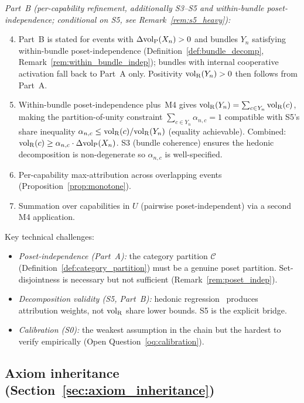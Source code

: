 \emph{Part~B (per-capability refinement, additionally S3--S5 and
within-bundle poset-independence; conditional on S5, see
Remark~\ref{rem:s5_heavy}):}
\begin{enumerate}
\setcounter{enumi}{3}
\item Part~B is stated for events with $\Delta{\operatorname{vol}_{\mathrm{P}}}(X_n) > 0$
  and bundles $Y_n$ satisfying within-bundle poset-independence
  (Definition~\ref{def:bundle_decomp},
  Remark~\ref{rem:within_bundle_indep}); bundles with internal
  cooperative activation fall back to Part~A only.  Positivity
  ${\operatorname{vol}_{\mathrm{R}}}(Y_n) > 0$ then follows from Part~A.
\item Within-bundle poset-independence plus~M4 gives
  ${\operatorname{vol}_{\mathrm{R}}}(Y_n) = \sum_{c \in Y_n} {\operatorname{vol}_{\mathrm{R}}}(c)$, making the
  partition-of-unity constraint
  $\sum_{c \in Y_n} \alpha_{n,c} = 1$ compatible with S5's share
  inequality $\alpha_{n,c} \leq {\operatorname{vol}_{\mathrm{R}}}(c)/{\operatorname{vol}_{\mathrm{R}}}(Y_n)$ (equality
  achievable).  Combined: ${\operatorname{vol}_{\mathrm{R}}}(c) \geq \alpha_{n,c} \cdot
  \Delta{\operatorname{vol}_{\mathrm{P}}}(X_n)$.  S3 (bundle coherence) ensures the hedonic
  decomposition is non-degenerate so $\alpha_{n,c}$ is
  well-specified.
\item Per-capability max-attribution across overlapping events
  (Proposition~\ref{prop:monotone}).
\item Summation over capabilities in $U$ (pairwise
  poset-independent) via a second M4 application.
\end{enumerate}

Key technical challenges:
\begin{itemize}
\item \emph{Poset-independence (Part~A):} the category partition
  $\mathcal{C}$ (Definition~\ref{def:category_partition}) must be
  a genuine poset partition.  Set-disjointness is necessary but
  not sufficient (Remark~\ref{rem:poset_indep}).
\item \emph{Decomposition validity (S5, Part~B):} hedonic
  regression~\citep{rosen1974hedonic} produces attribution weights,
  not ${\operatorname{vol}_{\mathrm{R}}}$ share lower bounds.  S5 is the explicit bridge.
\item \emph{Calibration (S0):} the weakest assumption in the chain
  but the hardest to verify empirically (Open
  Question~\ref{oq:calibration}).
\end{itemize}

\subsection{Axiom inheritance
(Section~\ref{sec:axiom_inheritance})}

